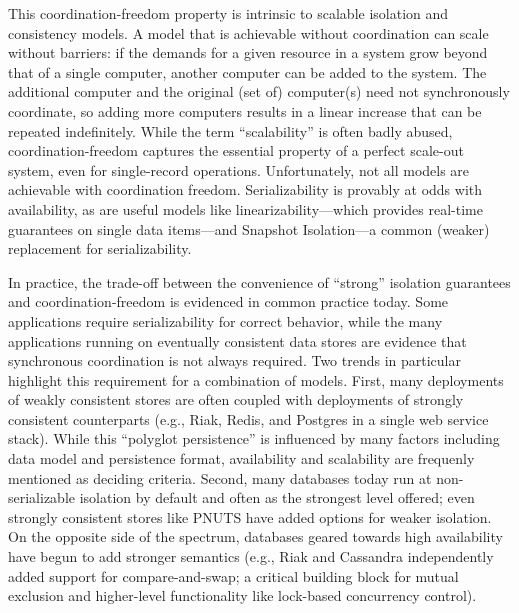 

This coordination-freedom property is intrinsic to scalable isolation
and consistency models. A model that is achievable without
coordination can scale without barriers: if the demands for a given
resource in a system grow beyond that of a single computer, another
computer can be added to the system. The additional computer and the
original (set of) computer(s) need not synchronously coordinate, so
adding more computers results in a linear increase that can be
repeated indefinitely. While the term ``scalability'' is often badly
abused, coordination-freedom captures the essential property of a
perfect scale-out system, even for single-record operations.
Unfortunately, not all models are achievable with coordination
freedom. Serializability is provably at odds with availability, as are
useful models like linearizability---which provides real-time
guarantees on single data items---and Snapshot Isolation---a common
(weaker) replacement for serializability.


 In practice, the
trade-off between the convenience of ``strong'' isolation guarantees
and coordination-freedom is evidenced in common practice today. Some
applications require serializability for correct behavior, while the
many applications running on eventually consistent data stores are
evidence that synchronous coordination is not always required. Two
trends in particular highlight this requirement for a combination of
models. First, many deployments of weakly consistent stores are often
coupled with deployments of strongly consistent counterparts (e.g.,
Riak, Redis, and Postgres in a single web service stack). While this
``polyglot persistence'' is influenced by many factors including data
model and persistence format, availability and scalability are
frequenly mentioned as deciding criteria. Second, many databases today
run at non-serializable isolation by default and often as the
strongest level offered; even strongly consistent stores like PNUTS
have added options for weaker isolation. On the opposite side of the
spectrum, databases geared towards high availability have begun to add
stronger semantics (e.g., Riak and Cassandra independently added
support for compare-and-swap; a critical building block for mutual
exclusion and higher-level functionality like lock-based concurrency
control).

